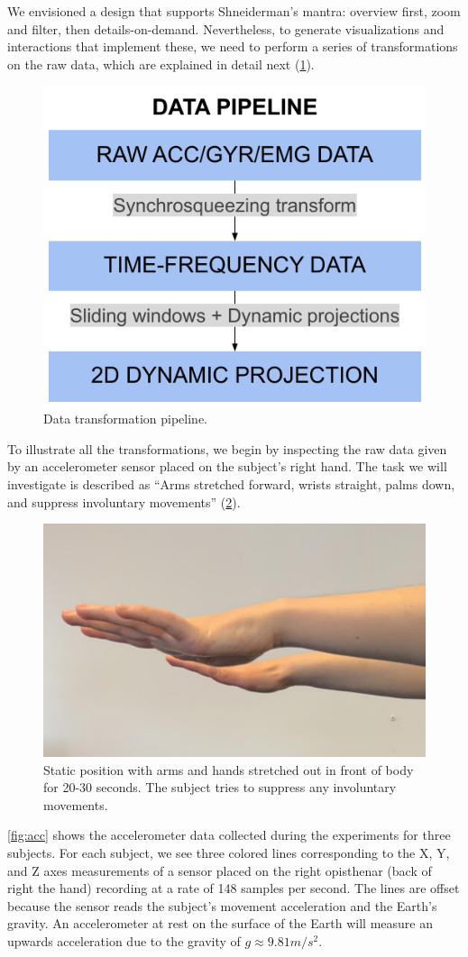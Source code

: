 We envisioned a design that supports Shneiderman's mantra: overview first, zoom and filter, then details-on-demand. Nevertheless, to generate visualizations and interactions that implement these, we need to perform a series of transformations on the raw data, which are explained in detail next (\cref{fig:nemo-pipe}). 

\begin{figure}[ht]
\centering
\includegraphics[width=.5\linewidth]{figures/nemo/simple-pipeline.pdf}
\caption{Data transformation pipeline.}
\label{fig:nemo-pipe}
\end{figure}

To illustrate all the transformations, we begin by inspecting the raw data given by an accelerometer sensor placed on the subject's right hand. The task we will investigate is described as ``Arms stretched forward, wrists straight, palms down, and suppress involuntary movements'' (\cref{fig:hands}).

\begin{figure}[ht]
\centering
\includegraphics[width=.5\linewidth]{figures/nemo/hands.png}
\caption{Static position with arms and hands stretched out in front of body for 20-30 seconds. The subject tries to suppress any involuntary movements.}
\label{fig:hands}
\end{figure}

\cref{fig:acc} shows the accelerometer data collected during the experiments for three subjects. For each subject, we see three colored lines corresponding to the X, Y, and Z axes measurements of a sensor placed on the right opisthenar (back of right the hand) recording at a rate of 148 samples per second. The lines are offset because the sensor reads the subject's movement acceleration and the Earth's gravity. An accelerometer at rest on the surface of the Earth will measure an upwards acceleration due to the gravity of $g \approx 9.81 m/s^2$. 

